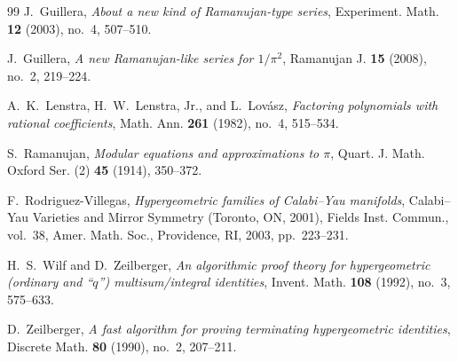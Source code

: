 \documentclass[11pt,a4paper]{article}
\theoremstyle{definition}
\begin{document}
\begin{thebibliography}{99}
J.~Guillera,
\emph{About a new kind of Ramanujan-type series},
Experiment. Math. \textbf{12} (2003), no.~4, 507--510.

J.~Guillera,
\emph{A new Ramanujan-like series for $1/\pi^2$},
Ramanujan J. \textbf{15} (2008), no.~2, 219--224.

A.~K.~Lenstra, H.~W.~Lenstra, Jr., and L.~Lov\'asz,
\emph{Factoring polynomials with rational coefficients},
Math. Ann. \textbf{261} (1982), no.~4, 515--534.

S.~Ramanujan,
\emph{Modular equations and approximations to $\pi$},
Quart. J. Math. Oxford Ser. (2) \textbf{45} (1914), 350--372.

F.~Rodriguez-Villegas,
\emph{Hypergeometric families of Calabi--Yau manifolds},
Calabi--Yau Varieties and Mirror Symmetry (Toronto, ON, 2001), Fields Inst. Commun., vol.~38, Amer. Math. Soc., Providence, RI, 2003, pp.~223--231.

H.~S.~Wilf and D.~Zeilberger,
\emph{An algorithmic proof theory for hypergeometric (ordinary and ``$q$'') multisum/integral identities},
Invent. Math. \textbf{108} (1992), no.~3, 575--633.

D.~Zeilberger,
\emph{A fast algorithm for proving terminating hypergeometric identities},
Discrete Math. \textbf{80} (1990), no.~2, 207--211.

\end{thebibliography}
\end{document}
